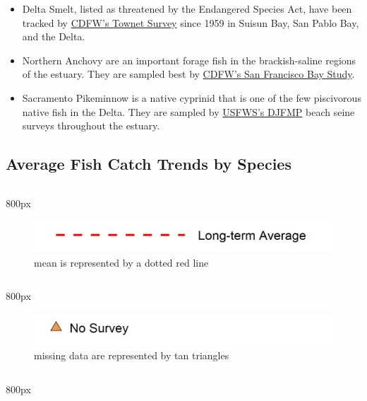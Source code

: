 \documentclass[
]{book}
\providecommand{\tightlist}{%
  \setlength{\itemsep}{0pt}\setlength{\parskip}{0pt}}
\begin{document}
\begin{itemize}
\tightlist
\item
  Delta Smelt, listed as threatened by the Endangered Species Act, have been tracked by \href{https://wildlife.ca.gov/Conservation/Delta/Townet-Survey}{CDFW's Townet Survey} since 1959 in Suisun Bay, San Pablo Bay, and the Delta.
\item
  Northern Anchovy are an important forage fish in the brackish-saline regions of the estuary. They are sampled best by \href{https://wildlife.ca.gov/Conservation/Delta/Bay-Study}{CDFW's San Francisco Bay Study}.
\item
  Sacramento Pikeminnow is a native cyprinid that is one of the few piscivorous native fish in the Delta. They are sampled by \href{https://www.fws.gov/lodi/juvenile_fish_monitoring_program/jfmp_index.htm}{USFWS's DJFMP} beach seine surveys throughout the estuary.
\end{itemize}

\hypertarget{average-fish-catch-trends-by-species-2}{%
\subsection{Average Fish Catch Trends by Species}\label{average-fish-catch-trends-by-species-2}}

\begin{column}{800px\textwidth}
\begin{figure}
\includegraphics[width=15.25in]{figures/mline} \caption{mean is represented by a dotted red line}\label{fig:unnamed-chunk-74}
\end{figure}
\end{column}

\begin{column}{800px\textwidth}
\begin{figure}
\includegraphics[width=15.25in]{figures/mpoint} \caption{missing data are represented by tan triangles}\label{fig:unnamed-chunk-75}
\end{figure}
\end{column}

\begin{column}{800px\textwidth}
\end{column}
\end{document}
